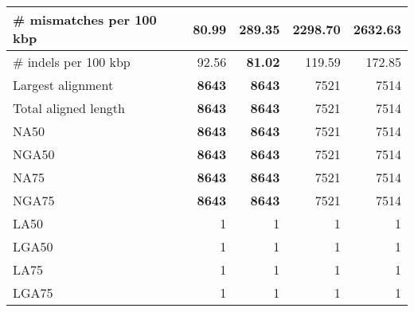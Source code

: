 \documentclass[12pt,a4paper]{article}
\begin{document}
\begin{table}[ht]
\begin{center}
\begin{tabular}{|l*{4}{|r}|}
\# mismatches per 100 kbp & {\bf 80.99} & 289.35 & 2298.70 & 2632.63 \\ \hline
\# indels per 100 kbp & 92.56 & {\bf 81.02} & 119.59 & 172.85 \\ \hline
Largest alignment & {\bf 8643} & {\bf 8643} & 7521 & 7514 \\ \hline
Total aligned length & {\bf 8643} & {\bf 8643} & 7521 & 7514 \\ \hline
NA50 & {\bf 8643} & {\bf 8643} & 7521 & 7514 \\ \hline
NGA50 & {\bf 8643} & {\bf 8643} & 7521 & 7514 \\ \hline
NA75 & {\bf 8643} & {\bf 8643} & 7521 & 7514 \\ \hline
NGA75 & {\bf 8643} & {\bf 8643} & 7521 & 7514 \\ \hline
LA50 & 1 & 1 & 1 & 1 \\ \hline
LGA50 & 1 & 1 & 1 & 1 \\ \hline
LA75 & 1 & 1 & 1 & 1 \\ \hline
LGA75 & 1 & 1 & 1 & 1 \\ \hline
\end{tabular}
\end{center}
\end{table}
\end{document}

